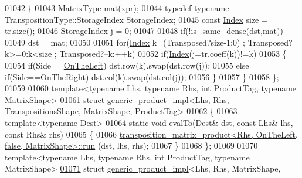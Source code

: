 \begin{DoxyCode}
01042   \{
01043     MatrixType mat(xpr);
01044     \textcolor{keyword}{typedef} \textcolor{keyword}{typename} TranspositionType::StorageIndex StorageIndex;
01045     \textcolor{keyword}{const} \hyperlink{namespace_eigen_a62e77e0933482dafde8fe197d9a2cfde}{Index} size = tr.size();
01046     StorageIndex j = 0;
01047 
01048     \textcolor{keywordflow}{if}(!is\_same\_dense(dst,mat))
01049       dst = mat;
01050 
01051     \textcolor{keywordflow}{for}(\hyperlink{namespace_eigen_a62e77e0933482dafde8fe197d9a2cfde}{Index} k=(Transposed?size-1:0) ; Transposed?k>=0:k<size ; Transposed?--k:++k)
01052       \textcolor{keywordflow}{if}(\hyperlink{namespace_eigen_a62e77e0933482dafde8fe197d9a2cfde}{Index}(j=tr.coeff(k))!=k)
01053       \{
01054         \textcolor{keywordflow}{if}(Side==\hyperlink{group__enums_ggac22de43beeac7a78b384f99bed5cee0ba129609b3bdf23b071f5f86cf2f995ec4}{OnTheLeft})        dst.row(k).swap(dst.row(j));
01055         \textcolor{keywordflow}{else} \textcolor{keywordflow}{if}(Side==\hyperlink{group__enums_ggac22de43beeac7a78b384f99bed5cee0ba99dc75d8e00b6c3a5bdc31940f47492b}{OnTheRight})  dst.col(k).swap(dst.col(j));
01056       \}
01057   \}
01058 \};
01059 
01060 \textcolor{keyword}{template}<\textcolor{keyword}{typename} Lhs, \textcolor{keyword}{typename} Rhs, \textcolor{keywordtype}{int} ProductTag, \textcolor{keyword}{typename} MatrixShape>
\hyperlink{struct_eigen_1_1internal_1_1generic__product__impl_3_01_lhs_00_01_rhs_00_01_transpositions_shapea83c7854330208d83886265b658a092d}{01061} \textcolor{keyword}{struct }\hyperlink{struct_eigen_1_1internal_1_1generic__product__impl}{generic\_product\_impl}<Lhs, Rhs, \hyperlink{struct_eigen_1_1_transpositions_shape}{TranspositionsShape}, 
      MatrixShape, ProductTag>
01062 \{
01063   \textcolor{keyword}{template}<\textcolor{keyword}{typename} Dest>
01064   \textcolor{keyword}{static} \textcolor{keywordtype}{void} evalTo(Dest& dst, \textcolor{keyword}{const} Lhs& lhs, \textcolor{keyword}{const} Rhs& rhs)
01065   \{
01066     \hyperlink{struct_eigen_1_1internal_1_1transposition__matrix__product}{transposition\_matrix\_product<Rhs, OnTheLeft, false, MatrixShape>::run}
      (dst, lhs, rhs);
01067   \}
01068 \};
01069 
01070 \textcolor{keyword}{template}<\textcolor{keyword}{typename} Lhs, \textcolor{keyword}{typename} Rhs, \textcolor{keywordtype}{int} ProductTag, \textcolor{keyword}{typename} MatrixShape>
\hyperlink{struct_eigen_1_1internal_1_1generic__product__impl_3_01_lhs_00_01_rhs_00_01_matrix_shape_00_01_tf888e33b0f360ba10ea614ccb9c9fdb1}{01071} \textcolor{keyword}{struct }\hyperlink{struct_eigen_1_1internal_1_1generic__product__impl}{generic\_product\_impl}<Lhs, Rhs, MatrixShape, 

\end{DoxyCode}
